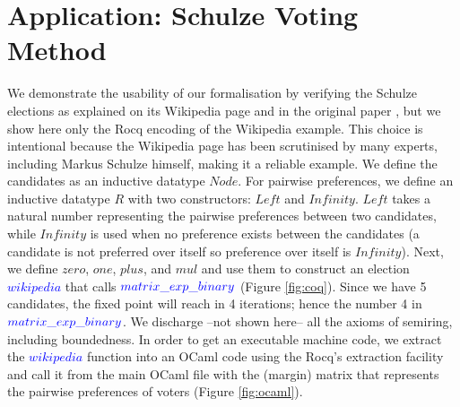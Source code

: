 \documentclass[a4paper,UKenglish,cleveref, autoref, thm-restate, anonymous]{lipics-v2021}
\begin{document}
\section{Application: Schulze Voting Method}
\label{sec:schulze-experiment}\label{sec:schulze-experiment}
We demonstrate the usability of our formalisation by verifying the Schulze elections as explained on its 
Wikipedia page \cite{schulze-wikipedia} and in the original paper \cite{schulze2011new}, 
but we show here only the Rocq encoding of the Wikipedia example. This choice is intentional because the Wikipedia page has been scrutinised by many experts, including Markus Schulze himself, making it a reliable example. We define the candidates
as an inductive datatype $Node$.  For pairwise preferences, we define an inductive datatype \(R\) with two constructors: \(Left\) and \(Infinity\). \(Left\) takes a natural number representing the pairwise preferences between two candidates, 
while \(Infinity\) is used when no preference exists between the candidates (a candidate is not preferred over itself so 
preference over itself is \(Infinity\)).
Next, we define $zero$, $one$, $plus$, and $mul$ and use them to construct an election \textcolor{blue}{$wikipedia$} that calls $\textcolor{blue}{matrix\_exp\_binary}$ (Figure \ref{fig:coq}). Since 
we have 5 candidates, the fixed point will reach in 4 iterations; hence the number 4 in $\textcolor{blue}{matrix\_exp\_binary}$. We discharge --not 
shown here-- all the axioms of semiring, including boundedness. In order to get an executable machine code, we extract the \textcolor{blue}{$wikipedia$} function into an OCaml code using the Rocq's extraction facility and call it from 
the main OCaml file with the (margin) matrix that represents the pairwise preferences of voters (Figure \ref{fig:ocaml}). 
\end{document}
